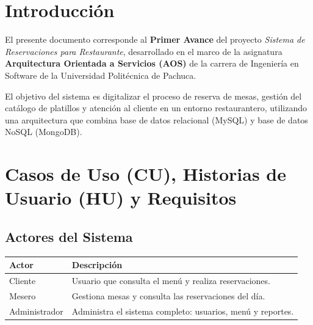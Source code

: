 \documentclass[12pt,a4paper]{article}
\begin{document}
\setcounter{page}{1}

\tableofcontents
\newpage

\section{Introducción}

El presente documento corresponde al \textbf{Primer Avance} del proyecto
\textit{Sistema de Reservaciones para Restaurante}, desarrollado en el marco
de la asignatura \textbf{Arquitectura Orientada a Servicios (AOS)} de la
carrera de Ingeniería en Software de la Universidad Politécnica de Pachuca.

El objetivo del sistema es digitalizar el proceso de reserva de mesas,
gestión del catálogo de platillos y atención al cliente en un entorno
restaurantero, utilizando una arquitectura que combina base de datos
relacional (MySQL) y base de datos NoSQL (MongoDB).



\section{Casos de Uso (CU), Historias de Usuario (HU) y Requisitos}

\subsection{Actores del Sistema}

\begin{center}
\begin{tabular}{lp{9cm}}
\toprule
\rowcolor{grisclaro}
\textbf{Actor} & \textbf{Descripción} \\
\midrule
Cliente       & Usuario que consulta el menú y realiza reservaciones. \\
Mesero        & Gestiona mesas y consulta las reservaciones del día. \\
Administrador & Administra el sistema completo: usuarios, menú y reportes. \\
\bottomrule
\end{tabular}
\end{center}
\end{document}
